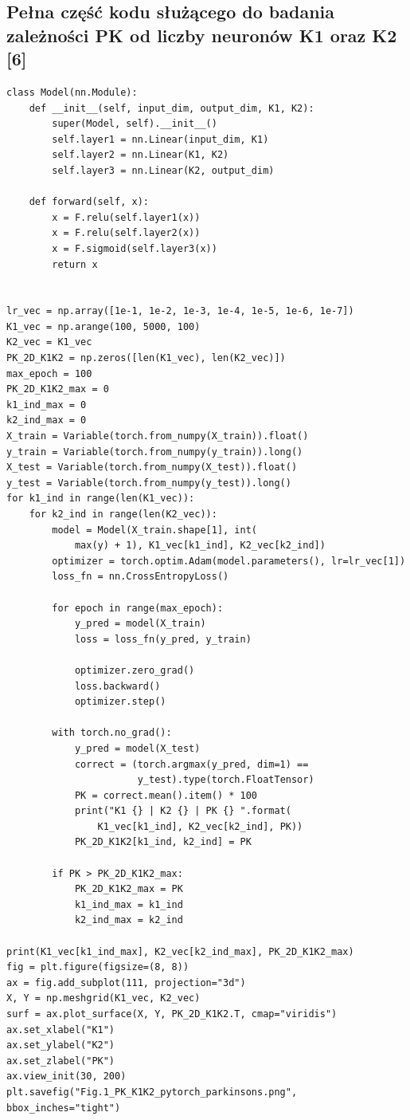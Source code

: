 \documentclass[a4paper]{article}
\begin{document}
\subsection{Pełna część kodu służącego do badania zależności PK od liczby neuronów K1 oraz K2 [6]}
\begin{verbatim}
class Model(nn.Module):
    def __init__(self, input_dim, output_dim, K1, K2):
        super(Model, self).__init__()
        self.layer1 = nn.Linear(input_dim, K1)
        self.layer2 = nn.Linear(K1, K2)
        self.layer3 = nn.Linear(K2, output_dim)

    def forward(self, x):
        x = F.relu(self.layer1(x))
        x = F.relu(self.layer2(x))
        x = F.sigmoid(self.layer3(x))
        return x


lr_vec = np.array([1e-1, 1e-2, 1e-3, 1e-4, 1e-5, 1e-6, 1e-7])
K1_vec = np.arange(100, 5000, 100)
K2_vec = K1_vec
PK_2D_K1K2 = np.zeros([len(K1_vec), len(K2_vec)])
max_epoch = 100
PK_2D_K1K2_max = 0
k1_ind_max = 0
k2_ind_max = 0
X_train = Variable(torch.from_numpy(X_train)).float()
y_train = Variable(torch.from_numpy(y_train)).long()
X_test = Variable(torch.from_numpy(X_test)).float()
y_test = Variable(torch.from_numpy(y_test)).long()
for k1_ind in range(len(K1_vec)):
    for k2_ind in range(len(K2_vec)):
        model = Model(X_train.shape[1], int(
            max(y) + 1), K1_vec[k1_ind], K2_vec[k2_ind])
        optimizer = torch.optim.Adam(model.parameters(), lr=lr_vec[1])
        loss_fn = nn.CrossEntropyLoss()

        for epoch in range(max_epoch):
            y_pred = model(X_train)
            loss = loss_fn(y_pred, y_train)

            optimizer.zero_grad()
            loss.backward()
            optimizer.step()

        with torch.no_grad():
            y_pred = model(X_test)
            correct = (torch.argmax(y_pred, dim=1) ==
                       y_test).type(torch.FloatTensor)
            PK = correct.mean().item() * 100
            print("K1 {} | K2 {} | PK {} ".format(
                K1_vec[k1_ind], K2_vec[k2_ind], PK))
            PK_2D_K1K2[k1_ind, k2_ind] = PK

        if PK > PK_2D_K1K2_max:
            PK_2D_K1K2_max = PK
            k1_ind_max = k1_ind
            k2_ind_max = k2_ind

print(K1_vec[k1_ind_max], K2_vec[k2_ind_max], PK_2D_K1K2_max)
fig = plt.figure(figsize=(8, 8))
ax = fig.add_subplot(111, projection="3d")
X, Y = np.meshgrid(K1_vec, K2_vec)
surf = ax.plot_surface(X, Y, PK_2D_K1K2.T, cmap="viridis")
ax.set_xlabel("K1")
ax.set_ylabel("K2")
ax.set_zlabel("PK")
ax.view_init(30, 200)
plt.savefig("Fig.1_PK_K1K2_pytorch_parkinsons.png", bbox_inches="tight")
\end{verbatim}
\end{document}

